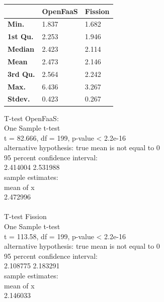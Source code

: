 \begin{tabular}{@{}lll@{}}
    \toprule
    & \textbf{OpenFaaS} & \textbf{Fission} \\ \midrule
    \textbf{Min.} & 1.837 & 1.682 \\
    \textbf{1st Qu.} & 2.253 & 1.946 \\
    \textbf{Median} & 2.423 & 2.114 \\
    \textbf{Mean} & 2.473 & 2.146 \\
    \textbf{3rd Qu.} & 2.564 & 2.242 \\
    \textbf{Max.} & 6.436 & 3.267 \\
    \textbf{Stdev.} & 0.423 & 0.267 \\ \bottomrule
\end{tabular}

T-test OpenFaaS:\\
One Sample t-test\\
    t = 82.666, df = 199, p-value < 2.2e-16\\
alternative hypothesis: true mean is not equal to 0\\
95 percent confidence interval:\\
 2.414004 2.531988\\
sample estimates:\\
 mean of x\\
2.472996\\\\

T-test Fission\\
One Sample t-test\\
    t = 113.58, df = 199, p-value < 2.2e-16\\
alternative hypothesis: true mean is not equal to 0\\
95 percent confidence interval:\\
   2.108775 2.183291\\
sample estimates:\\
 mean of x \\
2.146033 \\\\

